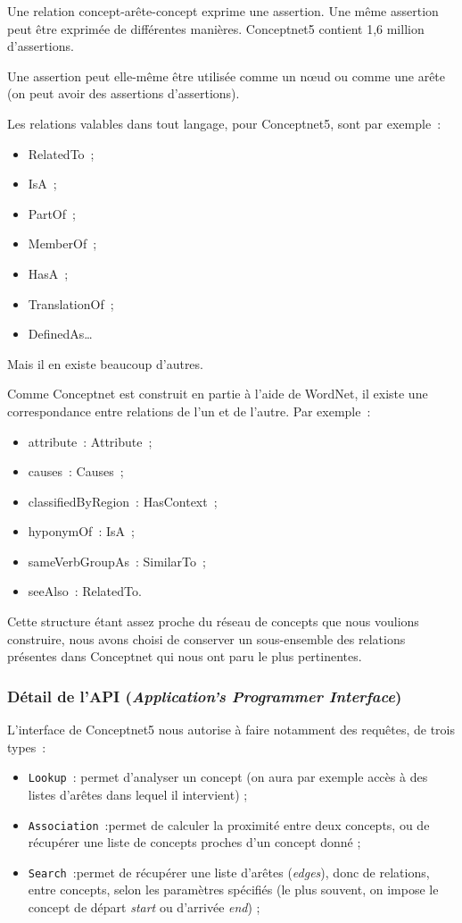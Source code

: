 \documentclass[a4paper, 12pt]{article}
\newcommand{\ang}[1]{\textit{#1}}%
\begin{document}
Une relation concept-arête-concept exprime une assertion. Une même assertion peut être exprimée de différentes manières. Conceptnet5 contient 1,6 million d'assertions.

Une assertion peut elle-même être utilisée comme un n\oe{}ud ou comme une arête (on peut avoir des assertions d'assertions).

Les relations valables dans tout langage, pour Conceptnet5, sont par exemple~:
\begin{itemize}
 \item RelatedTo~;
 \item IsA~;
 \item PartOf~;
 \item MemberOf~;
 \item HasA~;
 \item TranslationOf~;
 \item DefinedAs\ldots{}
\end{itemize}

Mais il en existe beaucoup d'autres.

Comme Conceptnet est construit en partie à l'aide de WordNet, il existe une correspondance entre relations de l'un et de l'autre. Par exemple~:
\begin{itemize}
 \item attribute~: Attribute~;
 \item causes~: Causes~;
 \item classifiedByRegion~: HasContext~;
 \item hyponymOf~: IsA~;
 \item sameVerbGroupAs~: SimilarTo~;
 \item seeAlso~: RelatedTo.
\end{itemize}

Cette structure étant assez proche du réseau de concepts que nous voulions construire, nous avons choisi de conserver un sous-ensemble des relations présentes dans Conceptnet qui nous ont paru le plus pertinentes.

\subsubsection{Détail de l'API (\ang{Application's Programmer Interface})}

L'interface de Conceptnet5 nous autorise à faire notamment des requêtes, de trois types~:
\begin{itemize}
 \item \texttt{Lookup}~: permet d'analyser un concept (on aura par exemple accès à des listes d'arêtes dans lequel il intervient) ;
 \item \texttt{Association}~:permet de calculer la proximité entre deux concepts, ou de récupérer une liste de concepts proches d'un concept donné ;
 \item \texttt{Search}~:permet de récupérer une liste d'arêtes (\ang{edges}), donc de relations, entre concepts, selon les paramètres spécifiés (le plus souvent, on impose le concept de départ \ang{start} ou d'arrivée \ang{end}) ;
\end{itemize}
\end{document}
